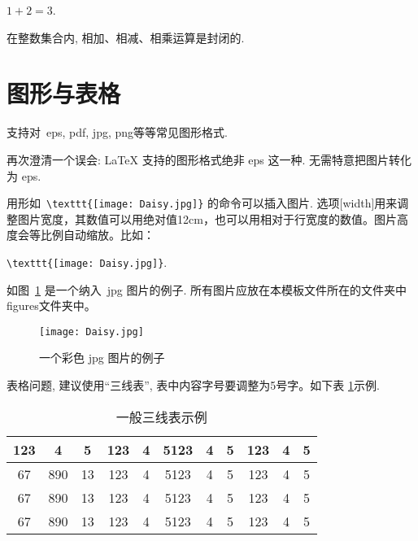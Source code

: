 \documentclass[forprint]{HedaBachelor}
\begin{document}
\begin{example}
  $1+2=3$.
\end{example}

\begin{corollary}
   在整数集合内, 相加、相减、相乘运算是封闭的.
\end{corollary}

\section{图形与表格}

支持对~eps, pdf, jpg, png等等常见图形格式.

再次\colorbox{red!45}{澄清一个误会}: \LaTeX{} 支持的图形格式绝非 eps 这一种. 无需特意把图片转化为 eps.

用形如~\verb|\texttt{[image: Daisy.jpg]}| 的命令可以插入图片. 选项[width]用来调整图片宽度，其数值可以用绝对值12cm，也可以用相对于行宽度的数值。图片高度会等比例自动缩放。比如：

\verb|\texttt{[image: Daisy.jpg]}|. 

如图~\ref{fig:1} 是一个纳入~jpg 图片的例子. 所有图片应放在本模板文件所在的文件夹中figures文件夹中。


\begin{figure}[!htb]
\centering
  \texttt{[image: Daisy.jpg]}
  \caption{一个彩色 jpg 图片的例子}
  \label{fig:1}
\end{figure}

表格问题, 建议使用“三线表”, 表中内容字号要调整为5号字。如下表 \ref{tab:1}示例.

\begin{table}[ht]
\centering %
\caption{一般三线表示例}
\vspace{-0.8em}  %
\label{tab:1}
    \begin{tabular}{c c c c c c c c c c c}
    \hline
    123 & 4  & 5  & 123 & 4 & 5123 & 4 & 5 & 123 & 4 & 5\\
    \hline
    67 & 890 & 13 & 123 & 4 & 5123 & 4 & 5 & 123 & 4 & 5\\
    67 & 890 & 13 & 123 & 4 & 5123 & 4 & 5 & 123 & 4 & 5\\
    67 & 890 & 13 & 123 & 4 & 5123 & 4 & 5 & 123 & 4 & 5\\
    \hline
    \end{tabular}
\end{table}
\end{document}
